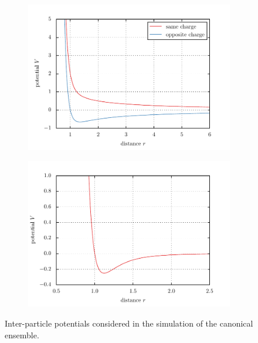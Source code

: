 \documentclass[11pt, a4paper]{article}
\numberwithin{equation}{section}
\begin{document}
\begin{figure}[p]
	\begin{subfigure}{1.0\textwidth}
		\centering
		\includegraphics{./figures/potential_coulomb.pdf}
		\label{fig:coulomb_core}
	\end{subfigure}
	\begin{subfigure}{1.0\textwidth}
		\centering
		\includegraphics{./figures/potential_lennard_jones.pdf}
		\label{fig:lennard_jones}
	\end{subfigure}
	\caption{Inter-particle potentials considered in the simulation of the canonical ensemble.}	
\end{figure}
\end{document}
